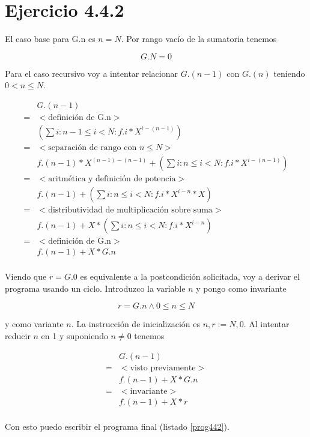 \documentclass{article}
\begin{document}
\section{Ejercicio 4.4.2}

El caso base para G.n es $n = N$. Por rango vacío de la sumatoria tenemos

$$
G.N = 0
$$

Para el caso recursivo voy a intentar relacionar $G.(n-1)$ con $G.(n)$ 
teniendo $0 < n \leq N$.

\begin{align*}
 & G.(n-1) \\
 = & <\text{definición de G.n}> \\
 & (\sum i : n-1 \leq i < N : f.i * X^{i-(n-1)}) \\
 = & <\text{separación de rango con } n \leq N> \\
 & f.(n-1) * X^{(n-1)-(n-1)} + (\sum i : n \leq i < N : f.i * X^{i-(n-1)}) \\
 = & <\text{aritmética y definición de potencia}> \\
 & f.(n-1) + (\sum i : n \leq i < N : f.i * X^{i-n}*X) \\
 = & <\text{distributividad de multiplicación sobre suma}> \\
 & f.(n-1) + X*(\sum i : n \leq i < N : f.i * X^{i-n}) \\
 = & <\text{definición de G.n}> \\
 & f.(n-1) + X*G.n \\
\end{align*}

Viendo que $r = G$.$0$ es equivalente a la postcondición solicitada, voy a derivar el
programa usando un ciclo. Introduzco la variable $n$ y pongo como invariante

$$
 r = G.n \wedge 0 \leq n \leq N
$$

y como variante $n$. La instrucción de inicialización es $n, r := N, 0$. Al intentar
reducir $n$ en 1 y suponiendo $n \neq 0$ tenemos

\begin{align*}
 & G.(n-1) \\
 = & <\text{visto previamente}> \\
 & f.(n-1) + X*G.n \\
 = & <\text{invariante}> \\
 & f.(n-1) + X*r \\
\end{align*}

Con esto puedo escribir el programa final (listado \ref{prog442}).
\end{document}
